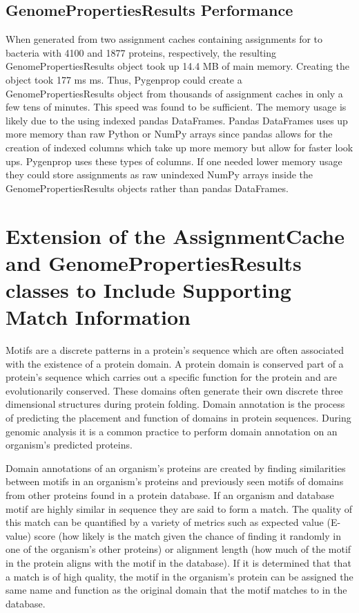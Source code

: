 \subsection{GenomePropertiesResults Performance}

When generated from two assignment caches containing assignments for to bacteria with 4100 and 1877 proteins, respectively, the resulting GenomePropertiesResults object took up 14.4 MB of main memory. Creating the  object took 177 ms  ms. Thus, Pygenprop could create a GenomePropertiesResults object from thousands of assignment caches in only a few tens of minutes. This speed was found to be sufficient. The memory usage is likely due to the using indexed pandas DataFrames. Pandas DataFrames uses up more memory than raw Python or NumPy arrays since pandas allows for the creation of indexed columns which take up more memory but allow for faster look ups. Pygenprop uses these types of columns. If one needed lower memory usage they could store assignments as raw unindexed NumPy arrays inside the GenomePropertiesResults objects rather than pandas DataFrames. 

\section{Extension of the AssignmentCache and GenomePropertiesResults classes to Include Supporting Match Information}

Motifs are a discrete patterns in a protein's sequence which are often associated with the existence of a protein domain. A protein domain is conserved part of a protein's sequence which carries out a specific function for the protein and are evolutionarily conserved. These domains often generate their own discrete three dimensional structures during protein folding. Domain annotation is the process of predicting the placement and function of domains in protein sequences. During genomic analysis it is a common practice to perform domain annotation on an organism's predicted proteins.

Domain annotations of an organism's proteins are created by finding similarities between motifs in an organism's proteins and previously seen motifs of domains from other proteins found in a protein database. If an organism and database motif are highly similar in sequence they are said to form a match. The quality of this match can be quantified by a variety of metrics such as expected value (E-value) score (how likely is the match given the chance of finding it randomly in one of the organism's other proteins) or alignment length (how much of the motif in the protein aligns with the motif in the database). If it is determined that that a match is of high quality, the motif in the organism's protein can be assigned the same name and function as the original domain that the motif matches to in the database.

